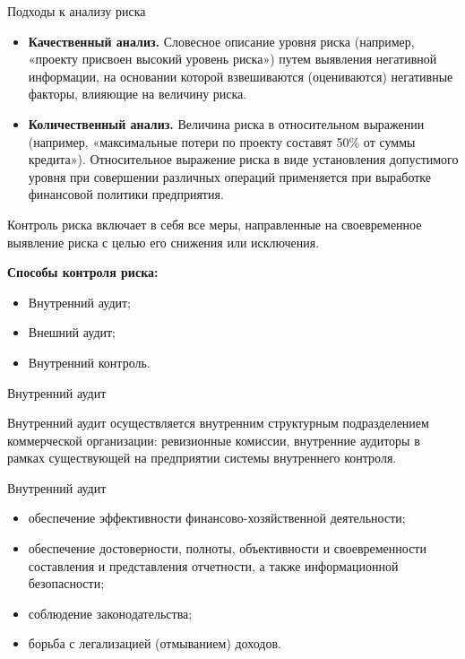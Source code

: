 \documentclass[_fin_decisions_lectures.tex]{subfiles}
\begin{document}
\begin{frame}[ allowframebreaks ]{Подходы к анализу риска}
\begin{itemize}
\item
\textbf{Качественный анализ. }Словесное описание уровня риска (например, «проекту присвоен высокий уровень риска») путем выявления негативной информации, на основании которой взвешиваются (оцениваются) негативные факторы, влияющие на величину риска.
\pagebreak
\item
\textbf{Количественный анализ.} Величина риска в относительном выражении (например, «максимальные потери по проекту составят 50\% от суммы кредита»). Относительное выражение риска в виде установления допустимого уровня при совершении различных операций применяется при выработке финансовой политики предприятия.
\end{itemize}
\end{frame}

\begin{frame}{Контроль риска }
\quad включает в себя все меры, направленные на своевременное выявление риска с целью его снижения или исключения. 

\textbf{Способы контроля риска:}

\begin{itemize}[<+->]
\item
Внутренний аудит;
\item
Внешний аудит;
\item
Внутренний контроль.
\end{itemize}
\end{frame}

\begin{frame}[shrink=5]{Внутренний аудит}
\begin{block}{Внутренний аудит}
\quad осуществляется внутренним структурным подразделением коммерческой организации: ревизионные комиссии, внутренние аудиторы в рамках существующей на предприятии системы внутреннего контроля.
\end{block}
\end{frame}
\begin{frame}{Внутренний аудит}
\begin{itemize}[<+->]
	\item
	обеспечение эффективности финансово-хозяйственной деятельности;
	\item
	обеспечение достоверности, полноты, объективности и своевременности составления и представления отчетности, а также информационной безопасности;
	\item
	соблюдение законодательства;
	\item
	борьба с легализацией (отмыванием) доходов.
\end{itemize}
\end{frame}
\end{document}
